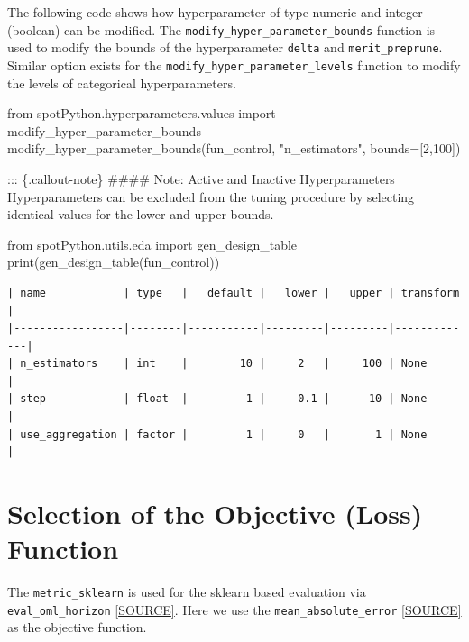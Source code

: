 \documentclass[
  letterpaper,
  DIV=11,
  numbers=noendperiod]{scrreprt}
\newenvironment{Shaded}{\begin{snugshade}}{\end{snugshade}}
\newcommand{\BuiltInTok}[1]{\textcolor[rgb]{0.00,0.23,0.31}{#1}}
\newcommand{\DecValTok}[1]{\textcolor[rgb]{0.68,0.00,0.00}{#1}}
\newcommand{\ImportTok}[1]{\textcolor[rgb]{0.00,0.46,0.62}{#1}}
\newcommand{\NormalTok}[1]{\textcolor[rgb]{0.00,0.23,0.31}{#1}}
\newcommand{\OperatorTok}[1]{\textcolor[rgb]{0.37,0.37,0.37}{#1}}
\newcommand{\StringTok}[1]{\textcolor[rgb]{0.13,0.47,0.30}{#1}}
\begin{document}
The following code shows how hyperparameter of type numeric and integer
(boolean) can be modified. The \texttt{modify\_hyper\_parameter\_bounds}
function is used to modify the bounds of the hyperparameter
\texttt{delta} and \texttt{merit\_preprune}. Similar option exists for
the \texttt{modify\_hyper\_parameter\_levels} function to modify the
levels of categorical hyperparameters.

\begin{Shaded}
\begin{Highlighting}[]
\ImportTok{from}\NormalTok{ spotPython.hyperparameters.values }\ImportTok{import}\NormalTok{ modify\_hyper\_parameter\_bounds}
\NormalTok{modify\_hyper\_parameter\_bounds(fun\_control, }\StringTok{"n\_estimators"}\NormalTok{, bounds}\OperatorTok{=}\NormalTok{[}\DecValTok{2}\NormalTok{,}\DecValTok{100}\NormalTok{])}
\end{Highlighting}
\end{Shaded}

::: \{.callout-note\} \#\#\#\# Note: Active and Inactive Hyperparameters
Hyperparameters can be excluded from the tuning procedure by selecting
identical values for the lower and upper bounds.

\begin{Shaded}
\begin{Highlighting}[]
\ImportTok{from}\NormalTok{ spotPython.utils.eda }\ImportTok{import}\NormalTok{ gen\_design\_table}
\BuiltInTok{print}\NormalTok{(gen\_design\_table(fun\_control))}
\end{Highlighting}
\end{Shaded}

\begin{verbatim}
| name            | type   |   default |   lower |   upper | transform   |
|-----------------|--------|-----------|---------|---------|-------------|
| n_estimators    | int    |        10 |     2   |     100 | None        |
| step            | float  |         1 |     0.1 |      10 | None        |
| use_aggregation | factor |         1 |     0   |       1 | None        |
\end{verbatim}

\hypertarget{selection-of-the-objective-loss-function-1}{%
\section{Selection of the Objective (Loss)
Function}\label{selection-of-the-objective-loss-function-1}}

The \texttt{metric\_sklearn} is used for the sklearn based evaluation
via \texttt{eval\_oml\_horizon}
\href{https://github.com/sequential-parameter-optimization/spotRiver/blob/main/src/spotRiver/evaluation/eval_bml.py}{{[}SOURCE{]}}.
Here we use the \texttt{mean\_absolute\_error}
\href{https://scikit-learn.org/stable/modules/generated/sklearn.metrics.mean_absolute_error.html}{{[}SOURCE{]}}
as the objective function.
\end{document}
